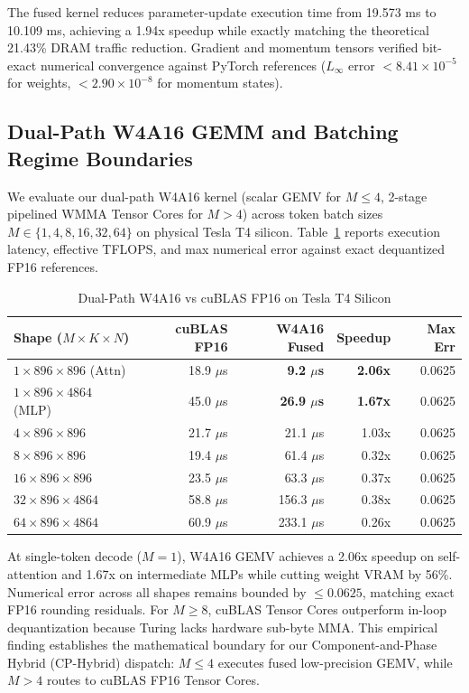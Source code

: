 \documentclass[10pt,twocolumn,letterpaper]{article}
\begin{document}
The fused kernel reduces parameter-update execution time from 19.573 ms to 10.109 ms, achieving a 1.94x speedup while exactly matching the theoretical 21.43\% DRAM traffic reduction. Gradient and momentum tensors verified bit-exact numerical convergence against PyTorch references ($L_\infty \text{ error } < 8.41 \times 10^{-5}$ for weights, $< 2.90 \times 10^{-8}$ for momentum states).

\subsection{Dual-Path W4A16 GEMM and Batching Regime Boundaries}
We evaluate our dual-path W4A16 kernel (scalar GEMV for $M \le 4$, 2-stage pipelined WMMA Tensor Cores for $M > 4$) across token batch sizes $M \in \{1, 4, 8, 16, 32, 64\}$ on physical Tesla T4 silicon. Table~\ref{tab:w4a16_regimes} reports execution latency, effective TFLOPS, and max numerical error against exact dequantized FP16 references.

\begin{table}[h]
\centering
\caption{Dual-Path W4A16 vs cuBLAS FP16 on Tesla T4 Silicon}
\label{tab:w4a16_regimes}
\small
\begin{tabular}{lrrrr}
\toprule
Shape ($M \times K \times N$) & cuBLAS FP16 & W4A16 Fused & Speedup & Max Err \\
\midrule
$1 \times 896 \times 896$ (Attn)   & 18.9 $\mu$s & \textbf{9.2 $\mu$s}  & \textbf{2.06x} & 0.0625 \\
$1 \times 896 \times 4864$ (MLP)   & 45.0 $\mu$s & \textbf{26.9 $\mu$s} & \textbf{1.67x} & 0.0625 \\
$4 \times 896 \times 896$          & 21.7 $\mu$s & 21.1 $\mu$s          & 1.03x          & 0.0625 \\
$8 \times 896 \times 896$          & 19.4 $\mu$s & 61.4 $\mu$s          & 0.32x          & 0.0625 \\
$16 \times 896 \times 896$         & 23.5 $\mu$s & 63.3 $\mu$s          & 0.37x          & 0.0625 \\
$32 \times 896 \times 4864$        & 58.8 $\mu$s & 156.3 $\mu$s         & 0.38x          & 0.0625 \\
$64 \times 896 \times 4864$        & 60.9 $\mu$s & 233.1 $\mu$s         & 0.26x          & 0.0625 \\
\bottomrule
\end{tabular}
\end{table}

At single-token decode ($M=1$), W4A16 GEMV achieves a 2.06x speedup on self-attention and 1.67x on intermediate MLPs while cutting weight VRAM by 56\%. Numerical error across all shapes remains bounded by $\le 0.0625$, matching exact FP16 rounding residuals. For $M \ge 8$, cuBLAS Tensor Cores outperform in-loop dequantization because Turing lacks hardware sub-byte MMA. This empirical finding establishes the mathematical boundary for our Component-and-Phase Hybrid (CP-Hybrid) dispatch: $M \le 4$ executes fused low-precision GEMV, while $M > 4$ routes to cuBLAS FP16 Tensor Cores.
\end{document}

